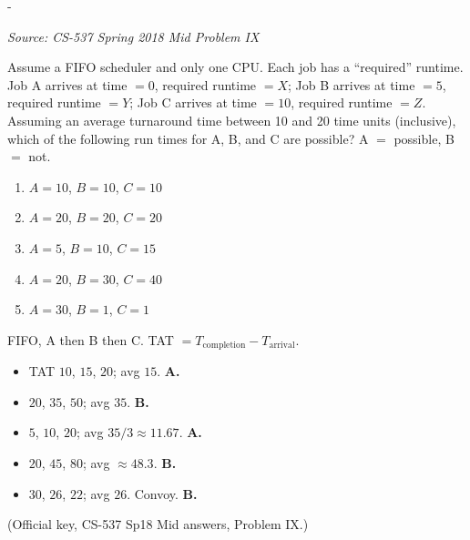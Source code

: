 \documentclass[11pt,a4paper]{article}
\makeatletter
\newcommand{\keepspace}[1]{\par\penalty-100\begingroup
  \setlength{\dimen@}{#1}\dimen@ii\pagegoal\advance\dimen@ii-\pagetotal
  \ifdim\dimen@>\dimen@ii\ifdim\dimen@ii>\z@\vfil\fi\break\fi\endgroup}
\newcounter{qn}[section]
\newenvironment{Qn}[4]{%
  \refstepcounter{qn}\keepspace{7\baselineskip}%
  \begin{tcolorbox}[qboxstyle, title={Q\thesection.\theqn\ \ [#1 \textbar\ #2]\ \ #4}]%
  {\footnotesize\color{g3}\textit{Source: #3}}\par\smallskip%
}{%
  \end{tcolorbox}%
}
\newenvironment{Sol}{%
  \begin{tcolorbox}[sboxstyle, title={Solution}]%
}{%
  \end{tcolorbox}\vspace{0.35em}%
}
\makeatother
\begin{document}
\begin{Qn}{Easy-Medium}{Lect 5--6}{CS-537 Spring 2018 Mid Problem IX}{FIFO turnaround in $[10,20]$: which runtimes?}
Assume a FIFO scheduler and only one CPU. Each job has a ``required'' runtime.
Job A arrives at time $=0$, required runtime $=X$;
Job B arrives at time $=5$, required runtime $=Y$;
Job C arrives at time $=10$, required runtime $=Z$.
Assuming an average turnaround time between 10 and 20 time units (inclusive), which of the following run times for A, B, and C are possible? A $=$ possible, B $=$ not.
\begin{enumerate}
  \item[41.] $A=10$, $B=10$, $C=10$
  \item[42.] $A=20$, $B=20$, $C=20$
  \item[43.] $A=5$, $B=10$, $C=15$
  \item[44.] $A=20$, $B=30$, $C=40$
  \item[45.] $A=30$, $B=1$, $C=1$
\end{enumerate}
\end{Qn}
\begin{Sol}
FIFO, A then B then C. TAT $= T_{\mathrm{completion}}-T_{\mathrm{arrival}}$.
\begin{itemize}
  \item[41.] TAT $10$, $15$, $20$; avg $15$. \textbf{A.}
  \item[42.] $20$, $35$, $50$; avg $35$. \textbf{B.}
  \item[43.] $5$, $10$, $20$; avg $35/3\approx 11.67$. \textbf{A.}
  \item[44.] $20$, $45$, $80$; avg $\approx 48.3$. \textbf{B.}
  \item[45.] $30$, $26$, $22$; avg $26$. Convoy. \textbf{B.}
\end{itemize}
(Official key, CS-537 Sp18 Mid answers, Problem IX.)
\end{Sol}
\end{document}
